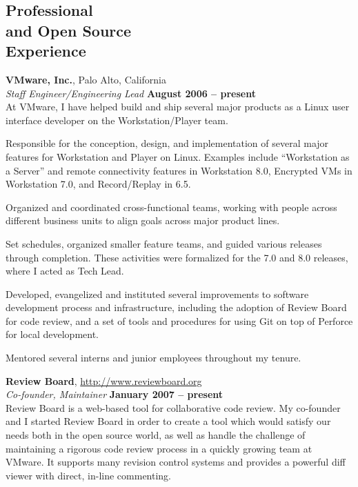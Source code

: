 \documentclass[margin,line]{resume}
\begin{document}
\begin{resume}
    \section{\mysidestyle Professional\\and Open Source\\Experience}
    {\bf VMware, Inc.}, Palo Alto, California \vspace{2mm}\\\vspace{1mm}%
    {\sl Staff Engineer/Engineering Lead} \hfill {\bf August 2006 -- present}\\
    At VMware, I have helped build and ship several major products as a Linux
    user interface developer on the Workstation/Player team.
    \vspace{3mm}
    \begin{list2}
    \item Responsible for the conception, design, and implementation of several
          major features for Workstation and Player on Linux. Examples include
          ``Workstation as a Server'' and remote connectivity features in
          Workstation 8.0, Encrypted VMs in Workstation 7.0, and Record/Replay
          in 6.5.
    \item Organized and coordinated cross-functional teams, working with people
          across different business units to align goals across major product
          lines.
    \item Set schedules, organized smaller feature teams, and guided various
          releases through completion. These activities were formalized for the
          7.0 and 8.0 releases, where I acted as Tech Lead.
    \item Developed, evangelized and instituted several improvements to software
          development process and infrastructure, including the adoption of
          Review Board for code review, and a set of tools and procedures for
          using Git on top of Perforce for local development.
    \item Mentored several interns and junior employees throughout my tenure.
    \end{list2}

    {\bf Review Board}, \href{http://www.reviewboard.org}{http://www.reviewboard.org} \vspace{2mm}\\\vspace{1mm}%
    {\sl Co-founder, Maintainer} \hfill {\bf January 2007 -- present}\\
    Review Board is a web-based tool for collaborative code review. My
    co-founder and I started Review Board in order to create a tool which would
    satisfy our needs both in the open source world, as well as handle the
    challenge of maintaining a rigorous code review process in a quickly growing
    team at VMware. It supports many revision control systems and provides a
    powerful diff viewer with direct, in-line commenting.


\end{resume}
\end{document}
